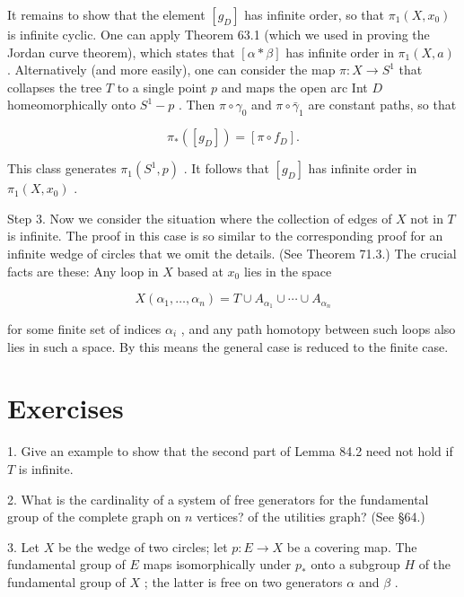 It remains to show that the element \(\left\lbrack  {g}_{D}\right\rbrack\) has infinite order, so that \({\pi }_{1}\left( {X,{x}_{0}}\right)\) is infinite cyclic. One can apply Theorem 63.1 (which we used in proving the Jordan curve theorem), which states that \(\left\lbrack  {\alpha  * \beta }\right\rbrack\) has infinite order in \({\pi }_{1}\left( {X,a}\right)\) . Alternatively (and more easily), one can consider the map \(\pi  : X \rightarrow  {S}^{1}\) that collapses the tree \(T\) to a single point \(p\) and maps the open arc Int \(D\) homeomorphically onto \({S}^{1} - p\) . Then \(\pi  \circ  {\gamma }_{0}\) and \(\pi  \circ  {\bar{\gamma }}_{1}\) are constant paths, so that

\[
{\pi }_{ * }\left( \left\lbrack  {g}_{D}\right\rbrack  \right)  = \left\lbrack  {\pi  \circ  {f}_{D}}\right\rbrack  .
\]

This class generates \({\pi }_{1}\left( {{S}^{1},p}\right)\) . It follows that \(\left\lbrack  {g}_{D}\right\rbrack\) has infinite order in \({\pi }_{1}\left( {X,{x}_{0}}\right)\) .

Step 3. Now we consider the situation where the collection of edges of \(X\) not in \(T\) is infinite. The proof in this case is so similar to the corresponding proof for an infinite wedge of circles that we omit the details. (See Theorem 71.3.) The crucial facts are these: Any loop in \(X\) based at \({x}_{0}\) lies in the space

\[
X\left( {{\alpha }_{1},\ldots ,{\alpha }_{n}}\right)  = T \cup  {A}_{{\alpha }_{1}} \cup  \cdots  \cup  {A}_{{\alpha }_{n}}
\]

for some finite set of indices \({\alpha }_{i}\) , and any path homotopy between such loops also lies in such a space. By this means the general case is reduced to the finite case.

\section*{Exercises}

1. Give an example to show that the second part of Lemma 84.2 need not hold if \(T\) is infinite.

2. What is the cardinality of a system of free generators for the fundamental group of the complete graph on \(n\) vertices? of the utilities graph? (See  \S 64.)

3. Let \(X\) be the wedge of two circles; let \(p : E \rightarrow  X\) be a covering map. The fundamental group of \(E\) maps isomorphically under \({p}_{ * }\) onto a subgroup \(H\) of the fundamental group of \(X\) ; the latter is free on two generators \(\alpha\) and \(\beta\) .

